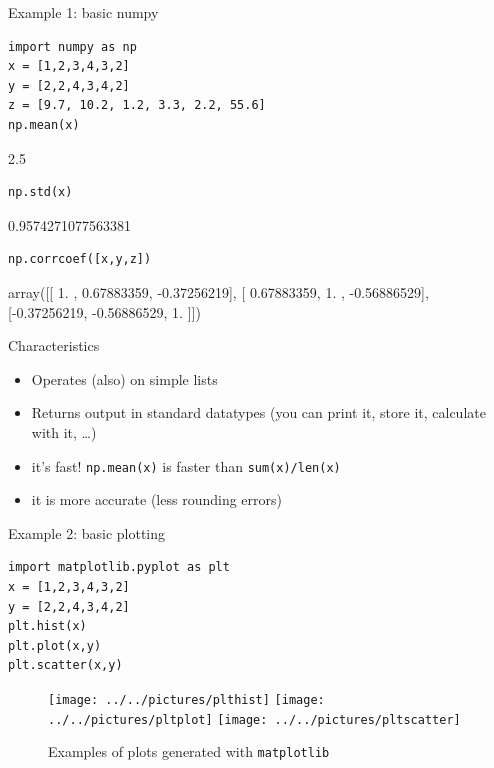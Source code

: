 \documentclass{beamer}
\begin{document}
\begin{frame}[fragile]{Example 1: basic numpy}
\begin{lstlisting}
import numpy as np
x = [1,2,3,4,3,2]
y = [2,2,4,3,4,2]
z = [9.7, 10.2, 1.2, 3.3, 2.2, 55.6]
np.mean(x)
\end{lstlisting}
\begin{lstlistingoutput}
2.5
\end{lstlistingoutput}
\begin{lstlisting}
np.std(x)
\end{lstlisting}
\begin{lstlistingoutput}
0.9574271077563381
\end{lstlistingoutput}

\begin{lstlisting}
np.corrcoef([x,y,z])
\end{lstlisting}

\begin{lstlistingoutput}
array([[ 1.        ,  0.67883359, -0.37256219],
       [ 0.67883359,  1.        , -0.56886529],
       [-0.37256219, -0.56886529,  1.        ]])
\end{lstlistingoutput}

\end{frame}

\begin{frame}{Characteristics}
\begin{itemize}
	\item Operates (also) on simple lists
	\item Returns output in standard datatypes (you can print it, store it, calculate with it, \ldots)
	\item it's fast! \texttt{np.mean(x)} is faster than \texttt{sum(x)/len(x)}
	\item it is more accurate (less rounding errors) 
\end{itemize}
\end{frame}





\begin{frame}[fragile]{Example 2: basic plotting}
\begin{lstlisting}
import matplotlib.pyplot as plt
x = [1,2,3,4,3,2]
y = [2,2,4,3,4,2]
plt.hist(x)
plt.plot(x,y)
plt.scatter(x,y)
\end{lstlisting}


\begin{figure}[h]
	\centering
	\texttt{[image: ../../pictures/plthist]}\hfill
	\texttt{[image: ../../pictures/pltplot]}\hfill
	\texttt{[image: ../../pictures/pltscatter]}
	\caption{\label{fig:matplotlib}Examples of plots generated with \texttt{matplotlib}}
\end{figure}

\end{frame}
\end{document}
